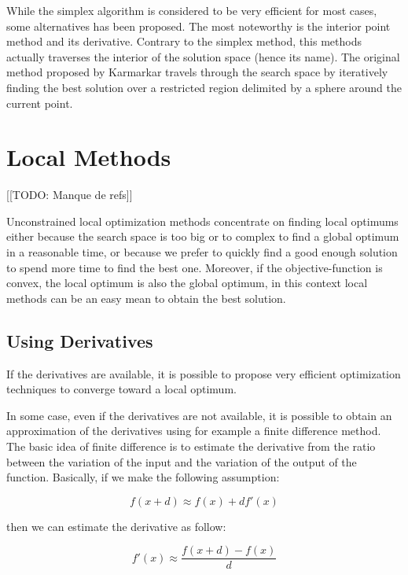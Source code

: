 While the simplex algorithm is considered to be very efficient for most cases, some alternatives has been proposed. The most noteworthy is the interior point method and its derivative. Contrary to the simplex method, this methods actually traverses the interior of the solution space (hence its name). The original method proposed by Karmarkar\cite{Karmarkar:1984:NPA:800057.808695} travels through the search space by iteratively finding the best solution over a restricted region delimited by a sphere around the current point.

\section{Local Methods}

[[TODO: Manque de refs]]

Unconstrained local optimization methods concentrate on finding local optimums either because the search space is too big or to complex to find a global optimum in a reasonable time, or because we prefer to quickly find a good enough solution to spend more time to find the best one.
 Moreover, if the objective-function is convex, the local optimum is also the global optimum, in this context local methods can be an easy mean to obtain the best solution.

\subsection{Using Derivatives}

If the derivatives are available, it is possible to propose very efficient optimization techniques to converge toward a local optimum.

In some case, even if the derivatives are not available, it is possible to obtain an approximation of the derivatives using for example a finite difference method. The basic idea of finite difference is to estimate the derivative from the ratio between the variation of the input and the variation of the output of the function.
Basically, if we make the following assumption:

\begin{equation*}f(x + d) \approx f(x) +df'(x)\end{equation*}

then we can estimate the derivative as follow:

\begin{equation*}f'(x) \approx \frac{f(x + d)  - f(x)}{d}\end{equation*}


